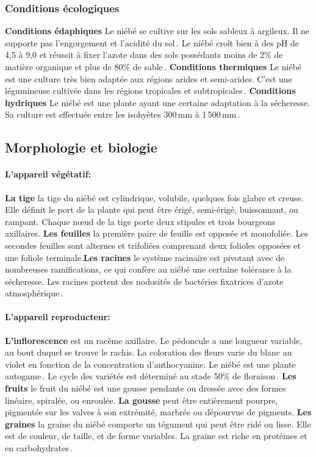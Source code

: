 \documentclass[a4paper,11pt]{article}
\begin{document}
\subsubsection{Conditions écologiques}

\textbf{Conditions édaphiques} Le niébé se cultive sur les sols
sableux à argileux. Il ne supporte pas l’engorgement et l’acidité du
sol\,\cite{Doggett_1988}. Le niébé croît bien à des pH de 4,5 à 9,0 et
réussit à fixer l’azote dans des sols possédants moins de 2\% de
matière organique et plus de 80\% de
sable\,\cite{SINGH_1997}. \textbf{Conditions thermiques} Le niébé est
une culture très bien adaptée aux régions arides et semi-arides. C’est
une légumineuse cultivée dans les régions tropicales et
subtropicales\,\cite{Doggett_1988}. \textbf{Conditions hydriques} Le
niébé est une plante ayant une certaine adaptation à la sécheresse. Sa
culture est effectuée entre les isohyètes 300\,mm à
1\,500\,mm\,\cite{Doggett_1988}.

\subsection{Morphologie et biologie}

  
\paragraph{L’appareil végétatif:}

\textbf{La tige} la tige du niébé est cylindrique, volubile, quelques fois
glabre et creuse. Elle définit le port de la plante qui peut être
érigé, semi-érigé, buissonnant, ou rampant. Chaque nœud de la tige
porte deux stipules et trois bourgeons axillaires. \textbf{Les feuilles} la
première paire de feuille est opposée et monofoliée. Les secondes
feuilles sont alternes et trifoliées comprenant deux folioles opposées
et une foliole terminale.\textbf{Les racines} le système racinaire est
pivotant avec de nombreuses ramifications, ce qui confère au niébé une
certaine tolérance à la sécheresse. Les racines portent des nodosités
de bactéries fixatrices d’azote atmosphérique\,\cite{Doggett_1988}.



\paragraph{L’appareil reproducteur:}

\textbf{L’inflorescence} est un racème axillaire. Le pédoncule a
une longueur variable, au bout duquel se trouve le rachis. La
coloration des fleurs varie du blanc au violet en fonction de la
concentration d’anthocyanine. Le niébé est une plante
autogame\,\cite{Fery}. Le cycle des variétés est déterminé au stade
50\% de floraison\,\cite{Drabo_1981}. \textbf{Les fruits} le fruit du niébé
est une gousse pendante ou dressée avec des formes linéaire, spiralée,
ou enroulée. \textbf{La gousse} peut être entièrement pourpre, pigmentée sur
les valves à son extrémité, marbrée ou dépourvue de
pigments. \textbf{Les graines} la graine du niébé comporte un tégument
qui peut être ridé ou lisse. Elle est de couleur, de taille, et de
forme variables. La graine est riche en protéines et en
carbohydrates\,\cite{Doggett_1988}.
\end{document}
